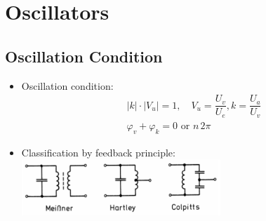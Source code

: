 \section{Oscillators}
\subsection{Oscillation Condition}
\begin{itemize}
    \itemsep0pt
    \item Oscillation condition:
        \begin{align*}
            &|k| \cdot |V_u| = 1, \quad V_u = \dfrac{U_v}{U_e}, k = \dfrac{U_a}{U_v}\\
            &\varphi_v + \varphi_k = 0\text{ or }n\,2\pi
        \end{align*}
    \item Classification by feedback principle:
    \includegraphics[width=7.5cm]{content/hfcomp/pictures/oscillator_types.png}
\end{itemize}
